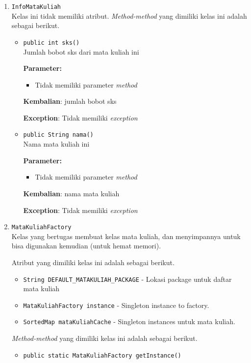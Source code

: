 \documentclass{article}
\begin{document}
\begin{enumerate}
\item \texttt{InfoMataKuliah}\\ 
Kelas ini tidak memiliki atribut. \textit{Method-method} yang dimiliki kelas ini adalah sebagai berikut.
\begin{itemize}
\item \texttt{public int sks()}\\ 
Jumlah bobot sks dari mata kuliah ini

\textbf{Parameter:}\begin{itemize}
\item Tidak memiliki parameter \textit{method}
\end{itemize}
\textbf{Kembalian}: jumlah bobot sks

\textbf{Exception}: Tidak memiliki \textit{exception}

\item \texttt{public String nama()}\\ 
Nama mata kuliah ini

\textbf{Parameter:}\begin{itemize}
\item Tidak memiliki parameter \textit{method}
\end{itemize}
\textbf{Kembalian}: nama mata kuliah

\textbf{Exception}: Tidak memiliki \textit{exception}

\end{itemize}
\item \texttt{MataKuliahFactory}\\ 
Kelas yang bertugas membuat kelas mata kuliah, dan menyimpannya untuk bisa
 digunakan kemudian (untuk hemat memori).

Atribut yang dimiliki kelas ini adalah sebagai berikut.
\begin{itemize}
\item \texttt{String DEFAULT\_MATAKULIAH\_PACKAGE} - Lokasi package untuk daftar mata kuliah
\item \texttt{MataKuliahFactory instance} - Singleton instance to factory.
\item \texttt{SortedMap mataKuliahCache} - Singleton instances untuk mata kuliah.
\end{itemize}
\textit{Method-method} yang dimiliki kelas ini adalah sebagai berikut.
\begin{itemize}
\item \texttt{public static MataKuliahFactory getInstance()}\\ 



\end{itemize}
\end{enumerate}
\end{document}
